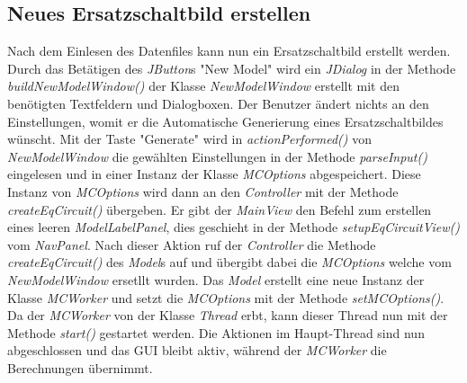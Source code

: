 \documentclass[a4paper,oneside,abstract,numbers=noenddot]{scrreprt}
\begin{document}
\subsection{Neues Ersatzschaltbild erstellen} \label{Neues Ersatzschaltbild erstellen}
Nach dem Einlesen des Datenfiles kann nun ein Ersatzschaltbild erstellt werden. Durch das Betätigen des \textit{JButton}s "{}New Model"{} wird ein \textit{JDialog} in der Methode \textit{buildNewModelWindow()} der Klasse \textit{NewModelWindow} erstellt mit den benötigten Textfeldern und Dialogboxen. Der Benutzer ändert nichts an den Einstellungen, womit er die Automatische Generierung eines Ersatzschaltbildes wünscht. Mit der Taste "{}Generate"{} wird in \textit{actionPerformed()} von \textit{NewModelWindow} die gewählten Einstellungen in der Methode \textit{parseInput()} eingelesen und in einer Instanz der Klasse \textit{MCOptions} abgespeichert. Diese Instanz von \textit{MCOptions} wird dann an den \textit{Controller} mit der Methode \textit{createEqCircuit()} übergeben. Er gibt der \textit{MainView} den Befehl zum erstellen eines leeren \textit{ModelLabelPanel}, dies geschieht in der Methode \textit{setupEqCircuitView()} vom \textit{NavPanel}. Nach dieser Aktion ruf der \textit{Controller} die Methode \textit{createEqCircuit()} des \textit{Model}s auf und übergibt dabei die \textit{MCOptions} welche vom \textit{NewModelWindow} ersetllt wurden. Das \textit{Model} erstellt eine neue Instanz der Klasse \textit{MCWorker} und setzt die \textit{MCOptions} mit der Methode \textit{setMCOptions()}. Da der \textit{MCWorker} von der Klasse \textit{Thread} erbt, kann dieser Thread nun mit der Methode \textit{start()} gestartet werden. Die Aktionen im Haupt-Thread sind nun abgeschlossen und das GUI bleibt aktiv, während der \textit{MCWorker} die Berechnungen übernimmt.\\
\\
\end{document}
